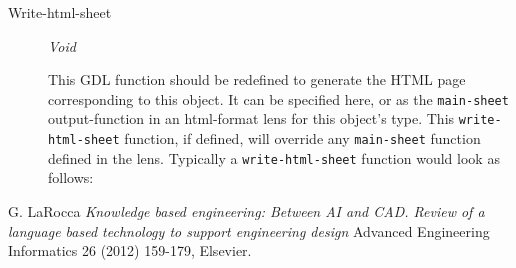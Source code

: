 \documentclass [11pt]{book}
\begin{document}
\begin{itemize}
\begin{description}
\item [Write-html-sheet]
\emph{Void}

 This GDL function should be redefined to generate the HTML page corresponding to this object.
It can be specified here, or as the \texttt{main-sheet} output-function in an html-format lens for this
object's type. This \texttt{write-html-sheet} function, if defined,  will override any \texttt{main-sheet}
function defined in the lens. Typically a \texttt{write-html-sheet} function would look as follows:




\end{description}







\end{itemize}





\backmatter

\begin{thebibliography}{1}

 G. LaRocca \emph{Knowledge based engineering: Between AI
and CAD. Review of a language based technology to support engineering design} 
Advanced Engineering Informatics 26 (2012) 159-179, Elsevier.

\end{thebibliography}


\printindex
\end{document}
